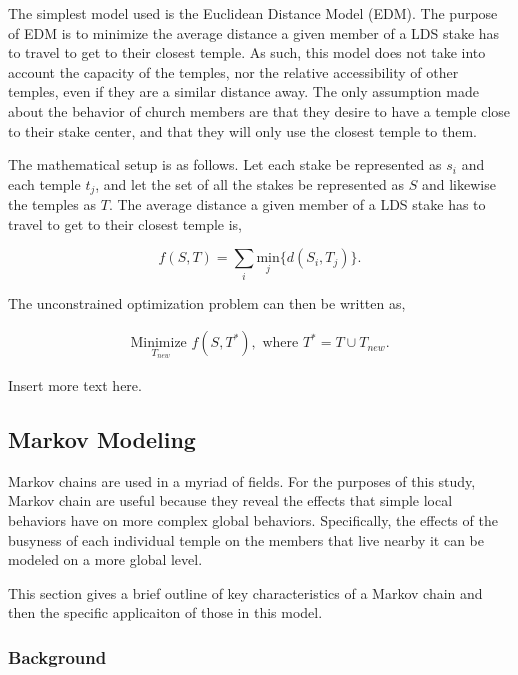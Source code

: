 \documentclass[twoside,twocolumn]{article}
\begin{document}
The simplest model used is the Euclidean Distance Model (EDM). The purpose of EDM is to minimize the average distance a given member of a LDS stake has to travel to get to their closest temple. As such, this model does not take into account the capacity of the temples, nor the relative accessibility of other temples, even if they are a similar distance away. The only assumption made about the behavior of church members are that they desire to have a temple close to their stake center, and that they will only use the closest temple to them.

The mathematical setup is as follows. Let each stake be represented as $s_i$ and each temple $t_j$, and let the set of all the stakes be represented as $S$ and likewise the temples as $T$. The average distance a given member of a LDS stake has to travel to get to their closest temple is, 

\begin{equation}
	f(S,T) = \sum_i \underset{j}{\text{min}}\{d(S_i,T_j)\}.
\end{equation}

The unconstrained optimization problem can then be written as,

\begin{equation}
\begin{aligned}
	\underset{T_{new}}{\text{Minimize }} f(S,T^*), \text{ where } T^* = T \cup T_{new}.
\end{aligned}
\end{equation}

Insert more text here.


\subsection{Markov Modeling}

Markov chains are used in a myriad of fields. For the purposes of this study, Markov chain are useful because they reveal the effects that simple local behaviors have on more complex global behaviors. Specifically, the effects of the busyness of each individual temple on the members that live nearby it can be modeled on a more global level.

This section gives a brief outline of key characteristics of a Markov chain and then the specific applicaiton of those in this model.

\subsubsection{Background}
\end{document}

